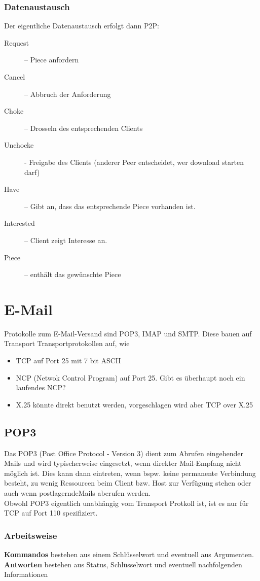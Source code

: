 \documentclass{article} %
\begin{document}
\subsubsection{Datenaustausch}
Der eigentliche Datenaustausch erfolgt dann P2P:
	\begin{description}
	\item[Request]  – Piece anfordern
	\item[Cancel] – Abbruch der Anforderung
	\item[Choke] – Drosseln des entsprechenden Clients
	\item[Unchocke] -  Freigabe des Clients (anderer Peer entscheidet, wer download starten darf)
	\item[Have]  – Gibt an, dass das entsprechende Piece vorhanden ist. 
	\item[Interested] – Client zeigt Interesse an. 
	\item[Piece] – enthält das gewünschte \glqq Piece\grqq 
	\end{description}

\section{E-Mail}
Protokolle zum E-Mail-Versand sind POP3, IMAP und SMTP. Diese bauen auf Transport Transportprotokollen auf, wie 
	\begin{itemize}
	\item TCP auf Port 25 mit 7 bit ASCII
	\item NCP (Netwok Control Program) auf Port 25. \glqq Gibt es überhaupt noch ein laufendes NCP? \grqq
	\item X.25 könnte direkt benutzt werden, vorgeschlagen wird aber TCP over X.25
	\end{itemize}
\subsection{POP3}
Das POP3 (Post Office Protocol - Version 3) dient zum Abrufen eingehender Mails  und wird typischerweise eingesetzt, wenn direkter Mail-Empfang nicht möglich ist. Dies kann dann eintreten, wenn bspw. keine permanente Verbindung besteht, zu wenig Ressourcen beim Client bzw. Host zur Verfügung stehen oder auch wenn \glqq postlagernde\grqq Mails aberufen werden.\\
Obwohl POP3 eigentlich unabhängig vom Transport Protkoll ist, ist es nur für TCP auf Port 110 spezifiziert.
\subsubsection{Arbeitsweise}
\textbf{Kommandos} bestehen aus einem Schlüsselwort und eventuell aus Argumenten. \textbf{Antworten} bestehen aus Status, Schlüsselwort und eventuell nachfolgenden Informationen 
\end{document}
